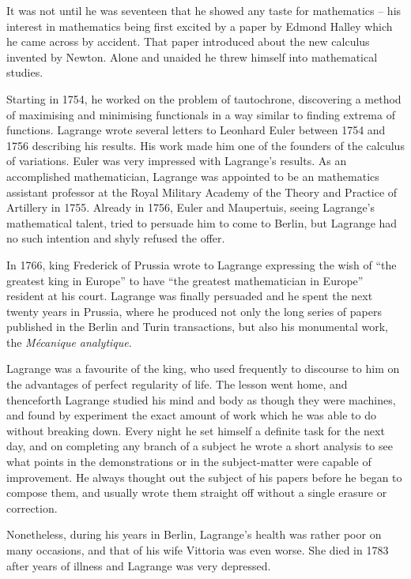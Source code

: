 \documentclass{article}
\begin{document}
It was not until he was seventeen that he showed any taste for mathematics – his interest in mathematics being first excited by a paper by Edmond Halley which he came across by accident. That paper introduced about the new calculus invented by Newton. Alone and unaided he threw himself into mathematical studies.

Starting in 1754, he worked on the problem of tautochrone, discovering a method of maximising and minimising functionals in a way similar to finding extrema of functions. Lagrange wrote several letters to Leonhard Euler between 1754 and 1756 describing his results. His work made him one of the founders of the calculus of variations. Euler was very impressed with Lagrange's results. As an accomplished mathematician, Lagrange was appointed to be an mathematics assistant professor at the Royal Military Academy of the Theory and Practice of Artillery in 1755. Already in 1756, Euler and Maupertuis, seeing Lagrange's mathematical talent, tried to persuade him to come to Berlin, but Lagrange had no such intention and shyly refused the offer.

In 1766, king Frederick of Prussia wrote to Lagrange expressing the wish of ``the greatest king in Europe'' to have ``the greatest mathematician in Europe'' resident at his court. Lagrange was finally persuaded and he spent the next twenty years in Prussia, where he produced not only the long series of papers published in the Berlin and Turin transactions, but also his monumental work, the {\em Mécanique analytique}.

Lagrange was a favourite of the king, who used frequently to discourse to him on the advantages of perfect regularity of life. The lesson went home, and thenceforth Lagrange studied his mind and body as though they were machines, and found by experiment the exact amount of work which he was able to do without breaking down. Every night he set himself a definite task for the next day, and on completing any branch of a subject he wrote a short analysis to see what points in the demonstrations or in the subject-matter were capable of improvement. He always thought out the subject of his papers before he began to compose them, and usually wrote them straight off without a single erasure or correction.

Nonetheless, during his years in Berlin, Lagrange's health was rather poor on many occasions, and that of his wife Vittoria was even worse. She died in 1783 after years of illness and Lagrange was very depressed.
\end{document}
